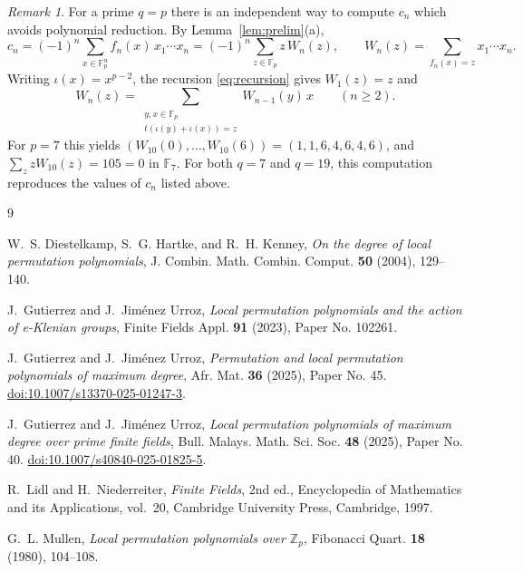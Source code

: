 \documentclass[11pt]{amsart}
\theoremstyle{definition}
\theoremstyle{remark}
\newtheorem{remark}[theorem]{Remark}
\newcommand{\F}{\mathbb{F}}
\begin{document}
\begin{remark}
For a prime $q=p$ there is an independent way to compute $c_n$ which avoids polynomial reduction. By Lemma~\ref{lem:prelim}(a),
\[
c_n=(-1)^n\sum_{x\in\F_p^n}f_n(x)\,x_1\cdots x_n=(-1)^n\sum_{z\in\F_p}z\,W_n(z),\qquad W_n(z)=\sum_{f_n(x)=z}x_1\cdots x_n.
\]
Writing $\iota(x)=x^{p-2}$, the recursion \eqref{eq:recursion} gives $W_1(z)=z$ and
\[
W_n(z)=\sum_{\substack{y,x\in\F_p\\ t(\iota(y)+\iota(x))=z}}W_{n-1}(y)\,x\qquad(n\ge2).
\]
For $p=7$ this yields $(W_{10}(0),\dots,W_{10}(6))=(1,1,6,4,6,4,6)$, and $\sum_zzW_{10}(z)=105=0$ in $\F_7$. For both $q=7$ and $q=19$, this computation reproduces the values of $c_n$ listed above.
\end{remark}

\begin{thebibliography}{9}

W.~S. Diestelkamp, S.~G. Hartke, and R.~H. Kenney, \emph{On the degree of local permutation polynomials}, J. Combin. Math. Combin. Comput. \textbf{50} (2004), 129--140.

J.~Gutierrez and J.~Jim\'enez Urroz, \emph{Local permutation polynomials and the action of e-Klenian groups}, Finite Fields Appl. \textbf{91} (2023), Paper No. 102261.

J.~Gutierrez and J.~Jim\'enez Urroz, \emph{Permutation and local permutation polynomials of maximum degree}, Afr. Mat. \textbf{36} (2025), Paper No. 45. \href{https://doi.org/10.1007/s13370-025-01247-3}{doi:10.1007/s13370-025-01247-3}.

J.~Gutierrez and J.~Jim\'enez Urroz, \emph{Local permutation polynomials of maximum degree over prime finite fields}, Bull. Malays. Math. Sci. Soc. \textbf{48} (2025), Paper No. 40. \href{https://doi.org/10.1007/s40840-025-01825-5}{doi:10.1007/s40840-025-01825-5}.

R.~Lidl and H.~Niederreiter, \emph{Finite Fields}, 2nd ed., Encyclopedia of Mathematics and its Applications, vol.~20, Cambridge University Press, Cambridge, 1997.

G.~L. Mullen, \emph{Local permutation polynomials over $\mathbb{Z}_p$}, Fibonacci Quart. \textbf{18} (1980), 104--108.

\end{thebibliography}
\end{document}

